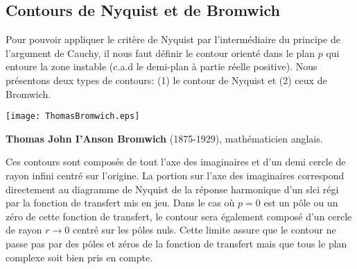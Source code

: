 \subsection{Contours de Nyquist et de Bromwich}
Pour pouvoir appliquer le critère de Nyquist par l'intermédiaire du principe 
de l'argument de Cauchy, il nous faut définir le contour orienté dans le plan 
$p$ qui entoure la zone instable (c.a.d le demi-plan à partie réelle positive).
Nous présentons deux types de contours: (1) le contour de Nyquist et (2) ceux de 
Bromwich.
\begin{marginfigure}
    \centering
    \texttt{[image: ThomasBromwich.eps]} 
    \caption*{\textbf{Thomas John I'Anson Bromwich} 
             (1875-1929), mathématicien anglais.}
\end{marginfigure}
Ces contours sont composés de tout l'axe des 
imaginaires et d'un demi cercle de rayon infini centré sur l'origine. La
portion sur l'axe des imaginaires correspond directement au diagramme de Nyquist
de la réponse harmonique d'un \gls{slci} régi par la fonction de transfert mis 
en jeu. Dans le cas où $p=0$ est un pôle ou un zéro de cette fonction
de transfert, le contour sera également composé d'un cercle de rayon   
$r\rightarrow0$ centré sur les pôles nuls. Cette limite assure que le contour
ne passe pas par des pôles et zéros de la fonction de transfert mais que tous
le plan complexe soit bien pris en compte.
\clearpage
